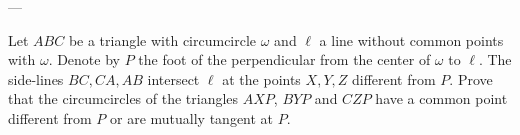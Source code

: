 
---

Let $ABC$ be a triangle with circumcircle $\omega$ and $\ell$ a line without common points with $\omega$. Denote by $P$ the foot of the perpendicular from the center of $\omega$ to $\ell$. The side-lines $BC,CA,AB$ intersect $\ell$ at the points $X,Y,Z$ different from $P$. Prove that the circumcircles of the triangles $AXP$, $BYP$ and $CZP$ have a common point different from $P$ or are mutually tangent at $P$.
